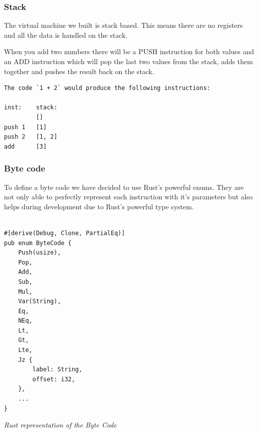 \documentclass{article}
\begin{document}
\subsubsection{Stack}
The virtual machine we built is stack based. This means there are no registers
and all the data is handled on the stack.

When you add two numbers there will be a PUSH instruction for both values
and an ADD instruction which will pop the last two values from the stack,
adds them together and pushes the result back on the stack.

\begin{verbatim}
The code `1 + 2` would produce the following instructions:

inst:    stack:
         []
push 1   [1]
push 2   [1, 2]
add      [3]
\end{verbatim}

\subsubsection{Byte code}
\label{sec:byte_code}

To define a byte code we have decided to use Rust's powerful enums. They are
not only able to perfectly represent each instruction with it's parameters but
also helps during development due to Rust's powerful type system.

\begin{verbatim}

#[derive(Debug, Clone, PartialEq)]
pub enum ByteCode {
    Push(usize),
    Pop,
    Add,
    Sub,
    Mul,
    Var(String),
    Eq,
    NEq,
    Lt,
    Gt,
    Lte,
    Jz {
        label: String,
        offset: i32,
    },
    ...
}

\end{verbatim}
\textit{Rust representation of the Byte Code} \\




\end{document}
